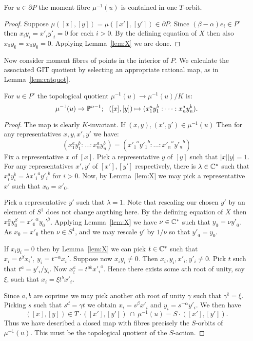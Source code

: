 %
%
%
\begin{lemma} \label{lem:3.2}
For \(u \in \partial P\) the moment fibre \(\mu^{-1}(u)\) is contained in one \(T\)-orbit.
\end{lemma}
%
%
%
\begin{proof}
Suppose \(\mu([x],[y]) = \mu([{x'}],[{y'}]) \in \partial P\). Since \( (\beta - \alpha)e_i \in P^\circ\) then \(x_iy_i = {x'}_i{y'}_i = 0\) for each \(i>0\). By the defining equation of \(X\) then also \(x_0y_0 = x_0y_0 = 0\). Applying Lemma~\ref{lem:X} we are done.
\end{proof}
%
%
%
Now consider moment fibres of points in the interior of \(P\). We calculate the associated GIT quotient by selecting an appropriate rational map, as in Lemma~\ref{lem:catquot}.
\begin{lemma} \label{lem:3.3}
For \(u \in P^\circ\) the topological quotient \(\mu^{-1}(u) \to \mu^{-1}(u)/K \) is:
\[
\mu^{-1}(u) \to \PP^{n-1}; \ \ ([x],[y]) \mapsto (x_1^a y_1^b: \dots : x_n^a y_n^b ).
\]
\end{lemma}
%
%
%
\begin{proof}
The map is clearly \(K\)-invariant. If \((x,y), ({x'},{y'}) \in \mu^{-1}(u)\) Then for any representatives \(x,y,{x'},{y'}\) we have:
\[
(x_1^a y_1^b: \dots : x_n^a y_n^b) = ({x'_1}^a {y'_1}^b: \dots : {x'_n}^a {y'_n}^b)
\]
Fix a representative \(x\) of \([x]\). Pick a representative \(y\) of \([y]\) such that \(|x||y| = 1\). For any representatives \({x'},{y'}\) of \([x'],[y']\) respectively, there is \(\lambda \in \mathbb{C}^*\) such that \( x_i^a y_i^b = \lambda {{x'_i}}^a {{y'_i}}^b\) for \(i>0\). Now, by Lemma~\ref{lem:X} we may pick a representative \({x'}\) such that \(x_0 = {{x'_0}}\).

Pick a representative \(y'\) such that \(\lambda = 1\). Note that rescaling our chosen \(y'\) by an element of \(S^1\) does not change anything here. By the defining equation of \(X\) then  \(x_0^\alpha y_0^\beta = {x'_0}^\alpha {y_0'}^\beta \). Applying Lemma~\ref{lem:X} we have \(\nu \in \mathbb{C}^*\) such that \(y_0 = \nu {y'}_0\). As \(x_0 = {x'}_0\) then \(\nu \in S^1\), and we may rescale \({y'}\) by \(1/\nu\) so that \({y'}_0 = y_0\).

If \(x_iy_i = 0\) then by Lemma~\ref{lem:X} we can pick \(t \in \mathbb{C}^*\) such that \(x_i = t^\beta x_i', \ y_i = t^{-\alpha} x_i'\). Suppose now \(x_iy_i \neq 0\). Then \(x_i,y_i,{x'_i},{y'_i} \neq 0\). Pick \(t\) such that \(t^a = {y'_i}/y_i\). Now \(x_i^a = t^{a b} {x'_i}^a\). Hence there exists some \(a\)th root of unity, say \(\xi\), such that \(x_i = \xi t^b {x'_i}\).

Since \(a,b\) are coprime we may pick another \(a\)th root of unity \(\gamma\) such that \(\gamma^b = \xi\). Picking \(s\) such that \(s^d = \gamma t\) we obtain \(x_i = s^\beta {x'}_i\) and \(y_i = s^{-\alpha} {y'_i}\). We then have
\[
([x],[y]) \in T \cdot ([x'],[y']) \ \cap \ \mu^{-1}(u) = S \cdot ([x'],[y']).
\]
Thus we have described a closed map with fibres precisely the \(S\)-orbits of \(\mu^{-1}(u)\). This must be the topological quotient of the \(S\)-action.
\end{proof}
